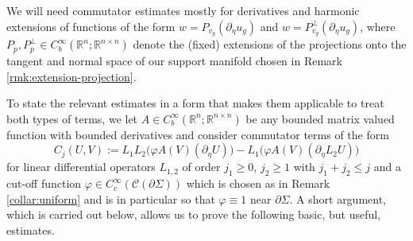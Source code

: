 \documentclass[10pt,reqno]{amsart}
\theoremstyle{plain}
\theoremstyle{definition}
\numberwithin{equation}{section}
\newcommand{\R}{\ensuremath{{\mathbb R}}}
\newcommand{\beq}{\begin{equation}}
\newcommand{\eeq}{\end{equation}}
\newcommand{\Col}{\mathcal C}
\newcommand{\pSi}{{\partial \Sigma}}
\newcommand{\peta}{\partial_\eta}
\begin{document}
We will need commutator estimates mostly for derivatives and harmonic extensions of functions of the form $w=P_{v_g}(\peta u_g)$
and $w=P_{v_g}^\perp (\peta u_g)$,  where 
 $P_p, P^\perp_p\in C_b^\infty(\R^n;\R^{n\times n})$ denote the (fixed) extensions of the projections onto the tangent and normal space of our support manifold 
chosen in Remark \ref{rmk:extension-projection}.

To state the relevant estimates in a form that makes them applicable to treat both types of terms, we let 
 $A \in C_b^\infty(\R^n;\R^{n\times n})$ be any bounded matrix valued function with bounded derivatives 
and consider commutator terms of the form 
\beq\label{def:comm-j}
    C_j(U,V):= L_1L_2\big(\varphi A(V)(\peta U)\big)-L_1\big(\varphi A(V)(\peta L_2 U)\big)
\eeq
for linear differential operators $L_{1,2}$ of order $j_1\geq 0$, $j_2\geq 1$ with  $j_1+j_2\leq j$ and a cut-off function $\varphi\in C_c^\infty(\Col(\pSi))$ which is chosen as in Remark \ref{collar:uniform} and is in particular so that $\varphi\equiv 1$ near $\pSi$. A short argument, which is carried out below, allows us to prove the following basic, but useful, estimates. 
\end{document}
